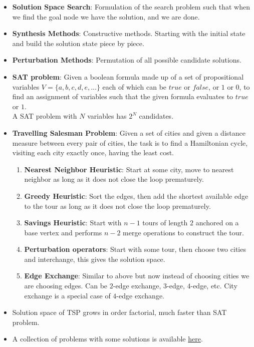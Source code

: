 \documentclass[a4paper]{article}
\begin{document}
\begin{itemize}
    \item \textbf{Solution Space Search}: Formulation of the search problem such that when we find the goal node we have the solution, and we are done.
    \item \textbf{Synthesis Methods}: Constructive methods. Starting with the initial state and build the solution state piece by piece.
    \item \textbf{Perturbation Methods}: Permutation of all possible candidate solutions.
    \item \textbf{SAT problem}: Given a boolean formula made up of a set of propositional variables $V=\{a,b,c,d,e,...\}$ each of which can be $true$ or $false$, or $1$ or $0$, to find an assignment of variables such that the given formula evaluates to $true$ or $1$.\\
    A SAT problem with $N$ variables has $2^N$ candidates.
    \item \textbf{Travelling Salesman Problem}: Given a set of cities and given a distance measure between every pair of cities, the task is to find a Hamiltonian cycle, visiting each city exactly once, having the least cost.
    \begin{enumerate}
        \item \textbf{Nearest Neighbor Heuristic}: Start at some city, move to nearest neighbor as long as it does not close the loop prematurely.
        \item \textbf{Greedy Heuristic}: Sort the edges, then add the shortest available edge to the tour as long as it does not close the loop prematurely.
        \item \textbf{Savings Heuristic}: Start with $n-1$ tours of length $2$ anchored on a base vertex and performs $n-2$ merge operations to construct the tour.
        \item \textbf{Perturbation operators}: Start with some tour, then choose two cities and interchange, this gives the solution space.
        \item \textbf{Edge Exchange}: Similar to above but now instead of choosing cities we are choosing edges. Can be $2$-edge exchange, $3$-edge, $4$-edge, etc. City exchange is a special case of $4$-edge exchange.
    \end{enumerate}
    \item Solution space of TSP grows in order factorial, much faster than SAT problem.
    \item A collection of problems with some solutions is available \href{http://comopt.ifi.uni-heidelberg.de/software/TSPLIB95/}{here}.

\end{itemize}
\end{document}
